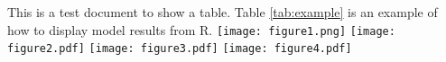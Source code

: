 \documentclass{article} %
\begin{document}
This is a test document to show a table. Table \ref{tab:example} is an example of how to display model results from R. %
\texttt{[image: figure1.png]}
\texttt{[image: figure2.pdf]} %
\texttt{[image: figure3.pdf]}
\texttt{[image: figure4.pdf]}
\end{document}
